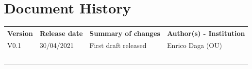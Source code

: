 \section*{Document History}

\begin{tabular}{|l|l|p{9.5cm}|l|}\hline
  \textbf{Version} & \textbf{Release date} & \textbf{Summary of changes} & \textbf{Author(s) - Institution}\\\hline  
  V0.1 & 30/04/2021 & First draft released & Enrico Daga (OU)\\\hline  
  & & & \\\hline  
  & & & \\\hline  
  & & & \\\hline  
  & & & \\\hline  
  & & & \\\hline  
  \end{tabular}

  \clearpage




